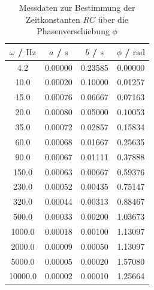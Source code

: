 \begin{table}
	\caption{Messdaten zur Bestimmung der Zeitkonstanten $RC$ über die Phasenverschiebung $\phi$}
	\label{tab:phasen}
	\centering
	\begin{tabular}{cccc}
		\toprule
		$\omega$ / $\si{\Hz}$ & $a$ / $\si{\second}$ & $b$ / $\si{\second}$ & $\phi$ / $\si{\radian}$ \\
		\midrule
		4.2                   & 0.00000              & 0.23585              & 0.00000                 \\
		10.0                  & 0.00020              & 0.10000              & 0.01257                 \\
		15.0                  & 0.00076              & 0.06667              & 0.07163                 \\
		20.0                  & 0.00080              & 0.05000              & 0.10053                 \\
		35.0                  & 0.00072              & 0.02857              & 0.15834                 \\
		60.0                  & 0.00068              & 0.01667              & 0.25635                 \\
		90.0                  & 0.00067              & 0.01111              & 0.37888                 \\
		150.0                 & 0.00063              & 0.00667              & 0.59376                 \\
		230.0                 & 0.00052              & 0.00435              & 0.75147                 \\
		320.0                 & 0.00044              & 0.00313              & 0.88467                 \\
		500.0                 & 0.00033              & 0.00200              & 1.03673                 \\
		1000.0                & 0.00018              & 0.00100              & 1.13097                 \\
		2000.0                & 0.00009              & 0.00050              & 1.13097                 \\
		5000.0                & 0.00005              & 0.00020              & 1.57080                 \\
		10000.0               & 0.00002              & 0.00010              & 1.25664                 \\
		\bottomrule
	\end{tabular}
\end{table}

